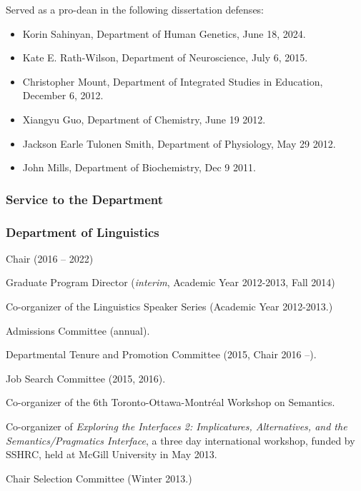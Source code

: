 \documentclass[11pt]{article}
\begin{document}
Served as a pro-dean in the following dissertation defenses:

\begin{itemize}
  \item Korin Sahinyan, Department of Human Genetics, June 18, 2024.
\item Kate E. Rath-Wilson, Department of Neuroscience, July 6, 2015.
\item Christopher Mount, Department of Integrated Studies in
  Education, December 6, 2012.
\item Xiangyu Guo, Department of Chemistry, June 19 2012.
\item Jackson Earle Tulonen Smith, Department of Physiology, May 29 2012.
\item John Mills, Department of Biochemistry, Dec 9 2011.

\end{itemize}

\subsubsection*{Service to the Department}

\subsubsection*{Department of Linguistics}

Chair (2016 -- 2022)

Graduate Program Director (\textit{interim}, Academic Year 2012-2013, Fall 2014)


Co-organizer of the Linguistics Speaker Series (Academic Year 2012-2013.)


Admissions Committee (annual).

Departmental Tenure and Promotion Committee (2015, Chair 2016 --).

Job Search Committee (2015, 2016).

Co-organizer of the 6th Toronto-Ottawa-Montr\'eal Workshop on
Semantics.

Co-organizer of \textit{Exploring the Interfaces 2: Implicatures,
  Alternatives, and the Semantics/Pragmatics Interface}, a three day
international workshop, funded by SSHRC, held at McGill University in May 2013.

Chair Selection Committee (Winter 2013.)

\end{document}
